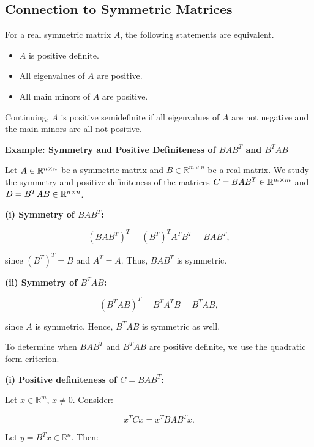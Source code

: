 \subsection{Connection to Symmetric Matrices}

For a real symmetric matrix \(A\), the following statements are equivalent.

\begin{itemize}
    
    \item \(A\) is positive definite.

    \item All eigenvalues of \(A\) are positive.

    \item All main minors of \(A\) are positive.

\end{itemize}

Continuing, \(A\) is positive semidefinite if all eigenvalues of \(A\) are not negative and the 
main minors are all not positive.

\textbf{Example: Symmetry and Positive Definiteness of \(BAB^T\) and \(B^T A B\)}

Let \( A \in \mathbb{R}^{n \times n} \) be a symmetric matrix and \( B \in \mathbb{R}^{m \times n} \) 
be a real matrix. We study the symmetry and positive definiteness of the matrices 
\( C = BAB^T \in \mathbb{R}^{m \times m} \) and \( D = B^T A B \in \mathbb{R}^{n \times n} \).

\textbf{(i) Symmetry of \( BAB^T \):}  

\[
    (BAB^T)^T = (B^T)^T A^T B^T = B A B^T,
\]

since \( (B^T)^T = B \) and \( A^T = A \). Thus, \( BAB^T \) is symmetric.

\textbf{(ii) Symmetry of \( B^T A B \):}  

\[
    (B^T A B)^T = B^T A^T B = B^T A B,
\]

since \( A \) is symmetric. Hence, \( B^T A B \) is symmetric as well.

To determine when \( BAB^T \) and \( B^T A B \) are positive definite, we use the quadratic form criterion.

\textbf{(i) Positive definiteness of \( C = BAB^T \):}  

Let \( x \in \mathbb{R}^m \), \( x \ne 0 \). Consider:

\[
    x^T C x = x^T BAB^T x.
\]

Let \( y = B^T x \in \mathbb{R}^n \). Then:

